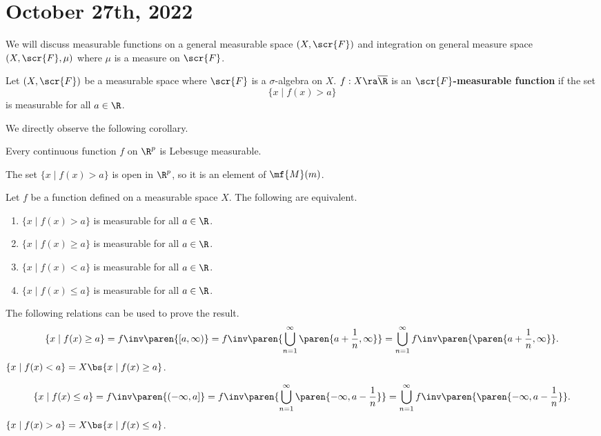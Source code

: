 \section*{October 27th, 2022}

We will discuss measurable functions on a general measurable space \((X, \scr{F})\) and integration on general measure space \((X, \scr{F}, \mu)\) where \(\mu\) is a measure on \(\scr{F}\).

  Let \((X, \scr{F})\) be a measurable space where \(\scr{F}\) is a \(\sigma\)-algebra on \(X\). \(f : X \ra \overline{\R}\) is an \textbf{\(\scr{F}\)-measurable function} if the set
\[
    \{x \mid f(x) > a\}
\]
is measurable for all \(a \in \R\).

We directly observe the following corollary.

\cor Every continuous function \(f\) on \(\R^p\) is Lebesuge measurable.

\pf The set \(\{x \mid f(x) > a\}\) is open in \(\R^p\), so it is an element of \(\mf{M}(m)\).

 Let \(f\) be a function defined on a measurable space \(X\). The following are equivalent.
\begin{enumerate}
    \item \(\{x \mid f(x) > a\}\) is measurable for all \(a \in \R\).
    \item \(\{x \mid f(x) \geq a\}\) is measurable for all \(a \in \R\).
    \item \(\{x \mid f(x) < a\}\) is measurable for all \(a \in \R\).
    \item \(\{x \mid f(x) \leq a\}\) is measurable for all \(a \in \R\).
\end{enumerate}

\pf The following relations can be used to prove the result.\\
 \vspace*{-10px}
\begin{equation*}
    \{x \mid f(x) \geq a\} = f\inv\paren{[a, \infty)} = f\inv\paren{\bigcup_{n=1}^{\infty} \paren{a + \frac{1}{n}, \infty}} = \bigcup_{n=1}^{\infty} f\inv\paren{\paren{a + \frac{1}{n}, \infty}}.
\end{equation*}
 \(\{x \mid f(x) < a\} = X \bs \{x \mid f(x) \geq a\}\).

 \vspace*{-10px}
\[
    \{x \mid f(x) \leq a\} = f\inv \paren{(-\infty, a]} = f\inv\paren{\bigcup_{n=1}^{\infty} \paren{-\infty, a - \frac{1}{n}}} = \bigcup_{n=1}^{\infty} f\inv\paren{\paren{-\infty, a - \frac{1}{n}}}.
\]
 \(\{x \mid f(x) > a\} = X \bs \{x \mid f(x) \leq a\}\).

